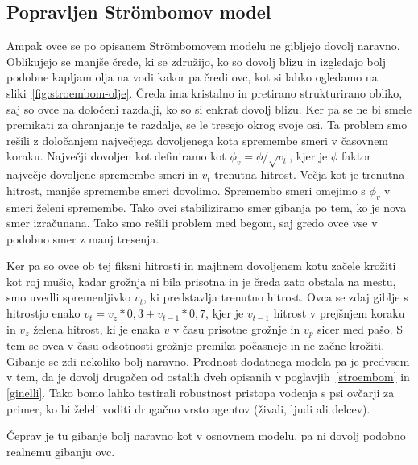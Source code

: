 \subsection{Popravljen Strömbomov model }\label{popravljen}

Ampak ovce se po opisanem Str{\"o}mbomovem modelu ne gibljejo dovolj naravno. Oblikujejo se manjše črede, ki se združijo, ko so dovolj blizu in izgledajo bolj podobne kapljam olja na vodi kakor pa čredi ovc, kot si lahko ogledamo na sliki~\ref{fig:stroembom-olje}. Čreda ima kristalno in pretirano strukturirano obliko, saj so ovce na določeni razdalji, ko so si enkrat dovolj blizu. Ker pa se ne bi smele premikati za ohranjanje te razdalje, se le tresejo okrog svoje osi. Ta problem smo rešili z določanjem največjega dovoljenega kota spremembe smeri v časovnem koraku. Največji dovoljen kot definiramo kot $\phi_v = \phi / \sqrt{v_t}$, kjer je $\phi$ faktor največje dovoljene spremembe smeri in $v_t$ trenutna hitrost. Večja kot je trenutna hitrost, manjše spremembe smeri dovolimo. Spremembo smeri omejimo s $\phi_v$ v smeri želeni spremembe. Tako ovci stabiliziramo smer gibanja po tem, ko je nova smer izračunana. Tako smo rešili problem med begom, saj gredo ovce vse v podobno smer z manj tresenja.

Ker pa so ovce ob tej fiksni hitrosti in majhnem dovoljenem kotu začele krožiti kot roj mušic, kadar grožnja ni bila prisotna in je čreda zato obstala na mestu, smo uvedli spremenljivko $v_t$, ki predstavlja trenutno hitrost. Ovca se zdaj giblje s hitrostjo enako $v_t = v_z * 0,3 + v_{t-1} * 0,7$, kjer je $v_{t-1}$ hitrost v prejšnjem koraku in $v_z$ želena hitrost, ki je enaka $v$ v času prisotne grožnje in $v_p$ sicer med pašo. S tem se ovca v času odsotnosti grožnje premika počasneje in ne začne krožiti. Gibanje se zdi nekoliko bolj naravno. Prednost dodatnega modela pa je predvsem v tem, da je dovolj drugačen od ostalih dveh opisanih v poglavjih~\ref{stroembom} in \ref{ginelli}. Tako bomo lahko testirali robustnost pristopa vodenja s psi ovčarji za primer, ko bi želeli voditi drugačno vrsto agentov (živali, ljudi ali delcev).

Čeprav je tu gibanje bolj naravno kot v osnovnem modelu, pa ni dovolj podobno realnemu gibanju ovc.

